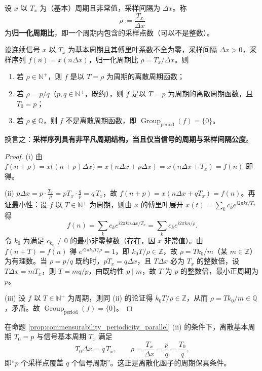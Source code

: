 \begin{definition}[归一化周期比]\label{def:normalised_ratio_parallel}
设 $x$ 以 $T_x$ 为（基本）周期且非常值，采样间隔为 $\Delta x$。称
\[
\rho:=\frac{T_x}{\Delta x}
\]
为\textbf{归一化周期比}，即一个周期内包含的采样点数（可以不是整数）。
\end{definition}

\begin{proposition}[采样序列的周期性与公度性]\label{prop:commensurability_periodicity_parallel}
设连续信号 $x$ 以 $T_x$ 为基本周期且其傅里叶系数不全为零，采样间隔 $\Delta x>0$，采样序列 $f(n)=x(n\Delta x)$，归一化周期比 $\rho=T_x/\Delta x$。则
\begin{enumerate}[label=(\roman*)]
    \item 若 $\rho\in\mathbb{N}^+$，则 $f$ 是以 $T=\rho$ 为周期的离散周期函数；
    \item 若 $\rho=p/q$（$p,q\in\mathbb{N}^+$，既约），则 $f$ 是以 $T=p$ 为周期的离散周期函数，且 $T_0=p$；
    \item 若 $\rho\notin\mathbb{Q}$，则 $f$ 不是离散周期函数，即 $\operatorname{Group}_{\mathrm{period}}(f)=\{0\}$。
\end{enumerate}
换言之：\textbf{采样序列具有非平凡周期结构，当且仅当信号的周期与采样间隔公度}。
\end{proposition}

\begin{proof}
(i) 由 $f(n+\rho)=x\big((n+\rho)\Delta x\big)=x(n\Delta x+\rho\Delta x)=x(n\Delta x+T_x)=f(n)$ 即得。

(ii) $p\Delta x=p\cdot\frac{T_x}{\rho}=pT_x\cdot\frac{q}{p}=q\,T_x$，故 $f(n+p)=x(n\Delta x+qT_x)=f(n)$。再证最小性：设 $f$ 以 $T\in\mathbb{N}^+$ 为周期，则由 $x$ 的傅里叶展开 $x(t)=\sum_k c_k e^{i2\pi kt/T_x}$ 得
\[
f(n)=\sum_k c_k e^{i2\pi kn\Delta x/T_x}=\sum_k c_k e^{i2\pi kn/\rho}.
\]
令 $k_0$ 为满足 $c_{k_0}\ne0$ 的最小非零整数（存在，因 $x$ 非常值）。由 $f(n+T)=f(n)$ 得 $e^{i2\pi k_0T/\rho}=1$，即 $k_0T/\rho\in\mathbb{Z}$，故 $\rho=Tk_0/m$（某 $m\in\mathbb{Z}$）为有理数。当 $\rho=p/q$ 既约时，$pT_x=q\Delta x$，且 $T\Delta x$ 必为 $T_x$ 的整数倍，设 $T\Delta x=mT_x$，则 $T=mq/p$，由既约性 $p\mid m$，故 $T$ 为 $p$ 的整数倍，最小正周期为 $p$。

(iii) 设 $f$ 以 $T\in\mathbb{N}^+$ 为周期，则同 (ii) 的论证得 $k_0T/\rho\in\mathbb{Z}$，从而 $\rho=Tk_0/m\in\mathbb{Q}$，矛盾。故 $\operatorname{Group}_{\mathrm{period}}(f)=\{0\}$。
\end{proof}

\begin{corollary}[采样周期与信号周期的换算]\label{cor:sampling_period_relation_parallel}
在命题 \ref{prop:commensurability_periodicity_parallel} (ii) 的条件下，离散基本周期 $T_0=p$ 与信号基本周期 $T_x$ 满足
\[
T_0\Delta x=q\,T_x,\qquad \rho=\frac{T_x}{\Delta x}=\frac{p}{q}=\frac{T_0}{q},
\]
即“$p$ 个采样点覆盖 $q$ 个信号周期”。这正是离散化函子的周期保真条件。
\end{corollary}

